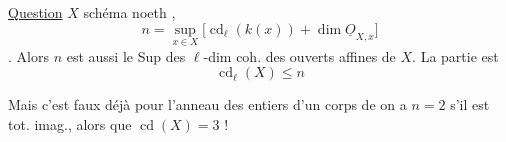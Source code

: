 \uline{Question} $X$ schéma noeth ,
\[
n=\sup_{x\in X}\bigl[\operatorname{cd}_{\ell}(k(x))+\dim\underline O_{X,x}\bigr]
\]
. Alors
$n$ est aussi le Sup des $\ell$-dim coh. des
ouverts affines de $X$. La partie  est
\[
\operatorname{cd}_{\ell}(X)\leq n
\]

Mais c'est faux déjà pour l'anneau
des entiers d'un corps de 
 on a \uline{$n=2$} s'il est  tot. imag.,
alors que $\operatorname{cd}(X)=3$ !
